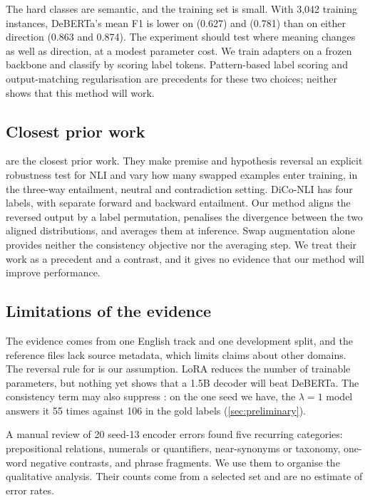The hard classes are semantic, and the training set is small. With 3,042 training instances, DeBERTa's mean F1 is lower on \NO{} (0.627) and \EQ{} (0.781) than on either direction (0.863 and 0.874). The experiment should test where meaning changes as well as direction, at a modest parameter cost. We train adapters on a frozen backbone and classify by scoring label tokens. Pattern-based label scoring \citep{schick-schutze-2021-exploiting} and output-matching regularisation \citep{liang-etal-2021-rdrop} are precedents for these two choices; neither shows that this method will work.

\subsection{Closest prior work}
\label{sec:wang-comparison}

\citet{wang-sun-xing-2019-swap} are the closest prior work. They make premise and hypothesis reversal an explicit robustness test for NLI and vary how many swapped examples enter training, in the three-way entailment, neutral and contradiction setting. DiCo-NLI has four labels, with separate forward and backward entailment. Our method aligns the reversed output by a label permutation, penalises the divergence between the two aligned distributions, and averages them at inference. Swap augmentation alone provides neither the consistency objective nor the averaging step. We treat their work as a precedent and a contrast, and it gives no evidence that our method will improve performance.

\subsection{Limitations of the evidence}
\label{sec:method-limitations}

The evidence comes from one English track and one development split, and the reference files lack source metadata, which limits claims about other domains. The reversal rule for \NO{} is our assumption. LoRA reduces the number of trainable parameters, but nothing yet shows that a 1.5B decoder will beat DeBERTa. The consistency term may also suppress \NO{}: on the one seed we have, the $\lambda = 1$ model answers it 55 times against 106 in the gold labels (\cref{sec:preliminary}).

A manual review of 20 seed-13 encoder errors found five recurring categories: prepositional relations, numerals or quantifiers, near-synonyms or taxonomy, one-word negative contrasts, and phrase fragments. We use them to organise the qualitative analysis. Their counts come from a selected set and are no estimate of error rates.

